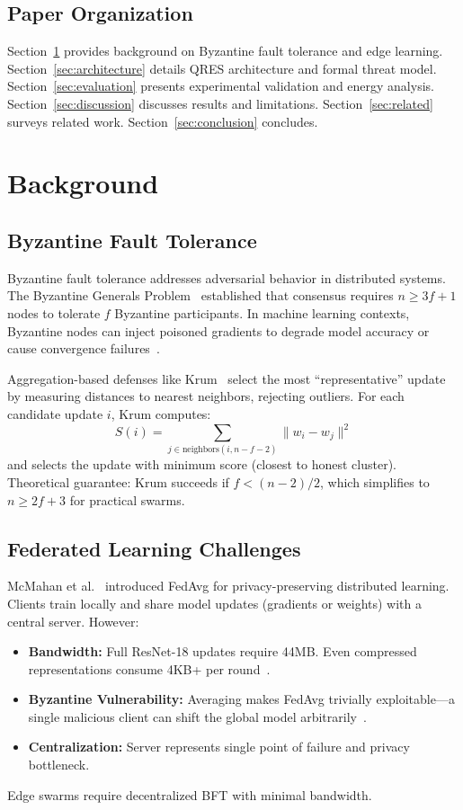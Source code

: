 \documentclass[conference,10pt]{IEEEtran}
\begin{document}
\subsection{Paper Organization}
Section~\ref{sec:background} provides background on Byzantine fault tolerance and edge learning. Section~\ref{sec:architecture} details QRES architecture and formal threat model. Section~\ref{sec:evaluation} presents experimental validation and energy analysis. Section~\ref{sec:discussion} discusses results and limitations. Section~\ref{sec:related} surveys related work. Section~\ref{sec:conclusion} concludes.

\section{Background}
\label{sec:background}

\subsection{Byzantine Fault Tolerance}
Byzantine fault tolerance addresses adversarial behavior in distributed systems. The Byzantine Generals Problem~\cite{lamport1982byzantine} established that consensus requires $n \geq 3f + 1$ nodes to tolerate $f$ Byzantine participants. In machine learning contexts, Byzantine nodes can inject poisoned gradients to degrade model accuracy or cause convergence failures~\cite{fang2020local}.

Aggregation-based defenses like Krum~\cite{blanchard2017machine} select the most ``representative'' update by measuring distances to nearest neighbors, rejecting outliers. For each candidate update $i$, Krum computes:
\begin{equation}
S(i) = \sum_{j \in \text{neighbors}(i, n-f-2)} \|w_i - w_j\|^2
\end{equation}
and selects the update with minimum score (closest to honest cluster). Theoretical guarantee: Krum succeeds if $f < (n-2)/2$, which simplifies to $n \geq 2f + 3$ for practical swarms.

\subsection{Federated Learning Challenges}
McMahan et al.~\cite{mcmahan2017communication} introduced FedAvg for privacy-preserving distributed learning. Clients train locally and share model updates (gradients or weights) with a central server. However:
\begin{itemize}
    \item \textbf{Bandwidth:} Full ResNet-18 updates require 44MB. Even compressed representations consume 4KB+ per round~\cite{alistarh2017qsgd}.
    \item \textbf{Byzantine Vulnerability:} Averaging makes FedAvg trivially exploitable---a single malicious client can shift the global model arbitrarily~\cite{bagdasaryan2020backdoor}.
    \item \textbf{Centralization:} Server represents single point of failure and privacy bottleneck.
\end{itemize}
Edge swarms require decentralized BFT with minimal bandwidth.
\end{document}
